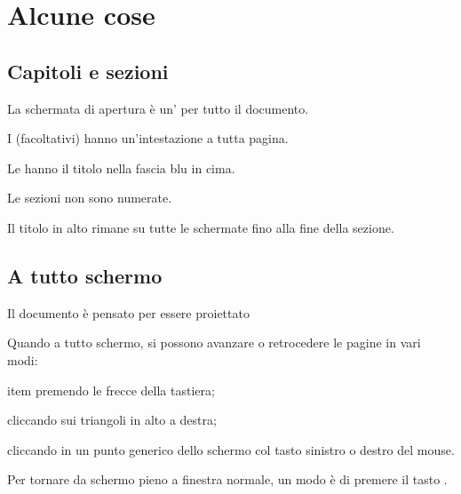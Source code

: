 \documentclass[italian,landscape]{report}
\begin{document}
\maketitle

\tableofcontents

\chapter{Alcune cose\label{intestazioneCapitolo}}


\section{Capitoli e sezioni}

\begin{firstheadlineitemize}
\item La schermata di apertura \`e un' per tutto il documento.
\pause
\item I  (facoltativi) hanno un'intestazione a tutta pagina.
\pause
\item Le  hanno il titolo nella fascia blu in cima.

\begin{secondheadlineitemize}
\pause
\item Le sezioni non sono numerate.

\newpage
\item Il titolo in alto rimane su tutte le schermate fino alla fine della sezione.
\end{secondheadlineitemize}
\end{firstheadlineitemize}

\section{A tutto schermo}
\begin{firstheadlineitemize}
\item Il documento \`e pensato per essere proiettato 
\pause
\begin{secondheadlineitemize}
\item Quando a tutto schermo, si possono avanzare o retrocedere le pagine in vari modi:
\begin{thirdheadlineitemize}
\pause
item premendo le frecce della tastiera;
\pause
\item cliccando sui triangoli \indietro{} \avanti{} in alto a destra;
\pause
\item cliccando in un punto generico dello schermo col tasto sinistro o destro del mouse.
\end{thirdheadlineitemize}
\pause
\item Per tornare da schermo pieno a finestra normale, un modo \`e di premere il tasto .
\end{secondheadlineitemize}
\end{firstheadlineitemize}
\end{document}
